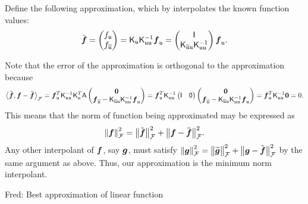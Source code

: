 \documentclass[reqno]{amsart}
\newcommand{\FredNote}[1]{{\color{blue}Fred: #1}}
\begin{document}
Define the following approximation, which  by interpolates the known function values:
\begin{equation*}
    \tvf = \begin{pmatrix} f_\fu \\ f_{\overline{\fu}} \end{pmatrix}
    = \mK_\fu \mK^{-1}_{\fu\fu} \vf_\fu 
    = 
    \begin{pmatrix} \mI \\ \mK_{\overline{\fu} \fu } \mK_{\fu\fu}^{-1} \end{pmatrix} 
    \vf_\fu.
\end{equation*}

Note that the error of the approximation is orthogonal to the approximation because \begin{equation*}
    \ip[\cf]{\tvf}{\vf - \tvf} = \vf_\fu^T \mK^{-1}_{\fu\fu}  \mK_\fu^T \mA \begin{pmatrix} \vzero \\ \vf_{\overline{\fu}} - \mK_{\overline{\fu} \fu } \mK_{\fu\fu}^{-1} \vf_\fu \end{pmatrix} =  \vf_\fu^T \mK^{-1}_{\fu\fu}  \begin{pmatrix} \mI & \mzero \end{pmatrix} \begin{pmatrix} \vzero \\ \vf_{\overline{\fu}} - \mK_{\overline{\fu} \fu } \mK_{\fu\fu}^{-1} \vf_\fu \end{pmatrix}  
    = \vf_\fu^T \mK^{-1}_{\fu\fu} \vzero = 0.
\end{equation*}
This means that the norm of function being approximated may be expressed as
\begin{equation*}
    \norm[\cf]{\vf}^2 = \bignorm[\cf]{\tvf}^2 + \bignorm[\cf]{\vf - \tvf}^2.
\end{equation*}
Any other interpolant of $\vf$, say $\vg$, must satisfy $\norm[\cf]{\vg}^2 = \bignorm[\cf]{\tvg}^2 + \bignorm[\cf]{\vg - \tvf}^2$ by the same argument as above.  Thus, our approximation is the minimum norm interpolant.

\FredNote{Best approximation of linear function }



\end{document}

